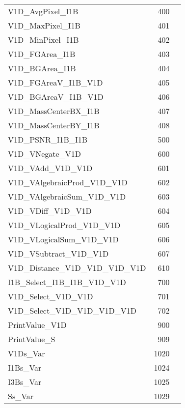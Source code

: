 \documentclass[11pt]{jsbook} %
\begin{document}
\begin{tabular}{l|r|l}
  V1D\_AvgPixel\_I1B               & 400 &  \\
  V1D\_MaxPixel\_I1B               & 401 &  \\
  V1D\_MinPixel\_I1B               & 402 &  \\
                           
  V1D\_FGArea\_I1B                 & 403 &  \\
  V1D\_BGArea\_I1B                 & 404 &  \\
  V1D\_FGAreaV\_I1B\_V1D            & 405 &  \\
  V1D\_BGAreaV\_I1B\_V1D            & 406 &  \\
                           
  V1D\_MassCenterBX\_I1B           & 407 &  \\
  V1D\_MassCenterBY\_I1B           & 408 &  \\
                           
  V1D\_PSNR\_I1B\_I1B               & 500 &  \\
                           
  V1D\_VNegate\_V1D                & 600 &  \\
                           
  V1D\_VAdd\_V1D\_V1D               & 601 &  \\
  V1D\_VAlgebraicProd\_V1D\_V1D     & 602 &  \\
  V1D\_VAlgebraicSum\_V1D\_V1D      & 603 &  \\
  V1D\_VDiff\_V1D\_V1D              & 604 &  \\
  V1D\_VLogicalProd\_V1D\_V1D       & 605 &  \\
  V1D\_VLogicalSum\_V1D\_V1D        & 606 &  \\
  V1D\_VSubtract\_V1D\_V1D          & 607 &  \\

  V1D\_Distance\_V1D\_V1D\_V1D\_V1D   & 610 &  \\

  I1B\_Select\_I1B\_I1B\_V1D\_V1D     & 700 &  \\
  V1D\_Select\_V1D\_V1D             & 701 &  \\
  V1D\_Select\_V1D\_V1D\_V1D\_V1D     & 702 &  \\
                           
  PrintValue\_V1D                 & 900 &  \\
  PrintValue\_S                   & 909 &  \\


  V1Ds\_Var                      & 1020 & \\
  I1Bs\_Var                      & 1024 & \\
  I3Bs\_Var                      & 1025 & \\
  Ss\_Var                         & 1029 & \\

\end{tabular}
\end{document}
